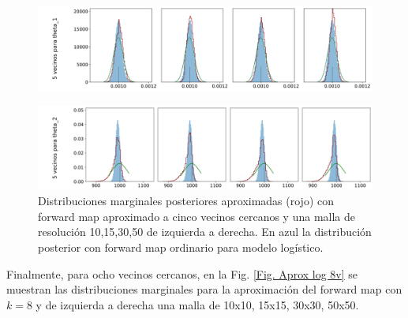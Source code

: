 \begin{figure}[H] 
    \centering 
    \includegraphics[width = 16 cm ]{img/Exp_Central_logistico_Sigma/Figuras/Generales/Convergencia_theta1_2_logistico_sigma.png} 
\end{figure} 
\begin{figure}[H] 
    \centering 
    \includegraphics[width = 16 cm ]{img/Exp_Central_logistico_Sigma/Figuras/Generales/Convergencia_theta2_2_logistico_sigma.png} 
    \caption{Distribuciones marginales posteriores aproximadas (rojo) con forward map aproximado a cinco vecinos cercanos y una malla de resolución 10,15,30,50 de izquierda a derecha. En azul la distribución posterior con forward map ordinario para modelo logístico.}
    \label{Fig. Aprox log 5v}
\end{figure} 

Finalmente, para ocho vecinos cercanos, en la Fig. \ref{Fig. Aprox log 8v} se muestran las distribuciones marginales para la aproximación del forward map con $k = 8$ y de izquierda a derecha una malla de 10x10, 15x15, 30x30, 50x50.

